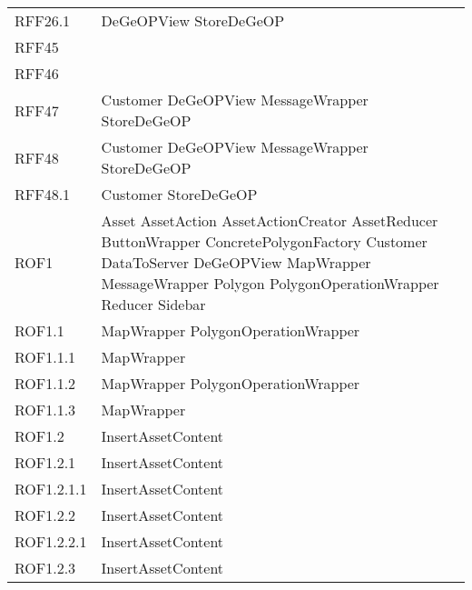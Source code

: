 \begin{longtable}{p{2.5cm}!{\VRule[1pt]}p{5cm}}
	RFF26.1 & DeGeOPView \newline StoreDeGeOP\\
	RFF45 & \\
	RFF46 & \\
	RFF47 & Customer \newline DeGeOPView \newline MessageWrapper \newline StoreDeGeOP\\
	RFF48 & Customer \newline DeGeOPView \newline MessageWrapper \newline StoreDeGeOP\\
	RFF48.1 & Customer \newline StoreDeGeOP\\
	ROF1 & Asset \newline AssetAction \newline AssetActionCreator \newline AssetReducer \newline ButtonWrapper \newline ConcretePolygonFactory \newline Customer \newline DataToServer \newline DeGeOPView \newline MapWrapper \newline MessageWrapper \newline Polygon \newline PolygonOperationWrapper \newline Reducer \newline Sidebar\\
	ROF1.1 & MapWrapper \newline PolygonOperationWrapper\\
	ROF1.1.1 & MapWrapper\\
	ROF1.1.2 & MapWrapper \newline PolygonOperationWrapper\\
	ROF1.1.3 & MapWrapper\\
	ROF1.2 & InsertAssetContent\\
	ROF1.2.1 & InsertAssetContent\\
	ROF1.2.1.1 & InsertAssetContent\\
	ROF1.2.2 & InsertAssetContent\\
	ROF1.2.2.1 & InsertAssetContent\\
	ROF1.2.3 & InsertAssetContent\\

\end{longtable}

